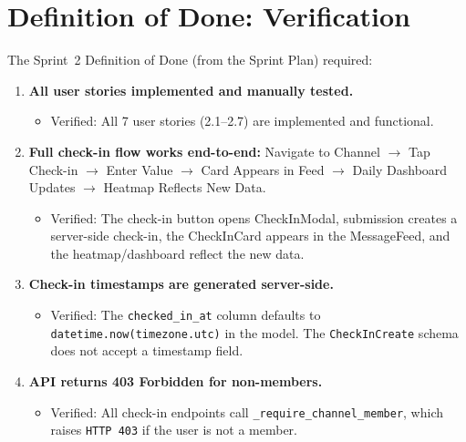 \documentclass[11pt]{article}
\begin{document}
\section{Definition of Done: Verification}

The Sprint~2 Definition of Done (from the Sprint Plan) required:

\begin{enumerate}[leftmargin=1.5em]
    \item \textbf{All user stories implemented and manually tested.}
    \begin{itemize}
        \item Verified: All 7 user stories (2.1--2.7) are implemented and functional.
    \end{itemize}

    \item \textbf{Full check-in flow works end-to-end:} Navigate to Channel $\rightarrow$ Tap Check-in $\rightarrow$ Enter Value $\rightarrow$ Card Appears in Feed $\rightarrow$ Daily Dashboard Updates $\rightarrow$ Heatmap Reflects New Data.
    \begin{itemize}
        \item Verified: The check-in button opens CheckInModal, submission creates a server-side check-in, the CheckInCard appears in the MessageFeed, and the heatmap/dashboard reflect the new data.
    \end{itemize}

    \item \textbf{Check-in timestamps are generated server-side.}
    \begin{itemize}
        \item Verified: The \texttt{checked\_in\_at} column defaults to \texttt{datetime.now(timezone.utc)} in the model. The \texttt{CheckInCreate} schema does not accept a timestamp field.
    \end{itemize}

    \item \textbf{API returns 403 Forbidden for non-members.}
    \begin{itemize}
        \item Verified: All check-in endpoints call \texttt{\_require\_channel\_member}, which raises \texttt{HTTP 403} if the user is not a member.
    \end{itemize}
\end{enumerate}
\end{document}
